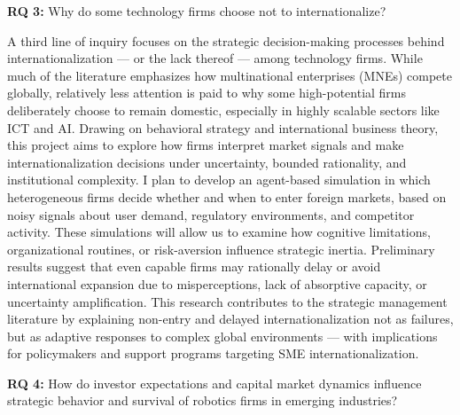 \documentclass[11pt,a4paper]{article}
\begin{document}
\textbf{RQ 3:} Why do some technology firms choose not to internationalize? 

A third line of inquiry focuses on the strategic decision-making processes behind internationalization — or the lack thereof — among technology firms. While much of the literature emphasizes how multinational enterprises (MNEs) compete globally, relatively less attention is paid to why some high-potential firms deliberately choose to remain domestic, especially in highly scalable sectors like ICT and AI. Drawing on behavioral strategy and international business theory, this project aims to explore how firms interpret market signals and make internationalization decisions under uncertainty, bounded rationality, and institutional complexity. I plan to develop an agent-based simulation in which heterogeneous firms decide whether and when to enter foreign markets, based on noisy signals about user demand, regulatory environments, and competitor activity. These simulations will allow us to examine how cognitive limitations, organizational routines, or risk-aversion influence strategic inertia. Preliminary results suggest that even capable firms may rationally delay or avoid international expansion due to misperceptions, lack of absorptive capacity, or uncertainty amplification. This research contributes to the strategic management literature by explaining non-entry and delayed internationalization not as failures, but as adaptive responses to complex global environments — with implications for policymakers and support programs targeting SME internationalization.

\textbf{RQ 4:} How do investor expectations and capital market dynamics influence strategic behavior and survival of robotics firms in emerging industries?
\end{document}
